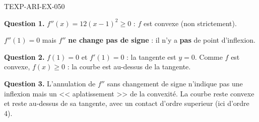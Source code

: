 \begin{corrige}{TEXP-ARI-EX-050}

\textbf{Question 1.} $f''(x) = 12(x-1)^2 \geq 0$ : $f$ est convexe (non strictement).


$f''(1) = 0$ mais $f''$ \textbf{ne change pas de signe} : il n'y a \textbf{pas} de point d'inflexion.

\textbf{Question 2.} $f(1) = 0$ et $f'(1) = 0$ : la tangente est $y = 0$. Comme $f$ est convexe, $f(x) \geq 0$ : la courbe est au-dessus de la tangente.

\textbf{Question 3.} L'annulation de $f''$ sans changement de signe n'indique pas une inflexion mais un << aplatissement >> de la convexité. La courbe reste convexe et reste au-dessus de sa tangente, avec un contact d'ordre superieur (ici d'ordre 4).

\end{corrige}

